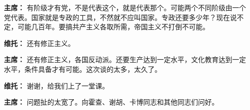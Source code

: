 \begin{duihua}
\item[\textbf{主席：}] 有阶级才有党，不是代表这个，就是代表那个。可能两个不同阶级由一个党代表。国家就是专政的工具，不然就不应叫国家。专政还要多少年？现在说不定，可能几百年。要搞共产主义各取所需，帝国主义不打倒不可能。
\item[\textbf{维托：}] 还有修正主义。
\item[\textbf{主席：}] 还有修正主义，各国反动派。还要生产达到一定水平，文化教育达到一定水平，条件具备才有可能。这次谈的太多，太久了。
\item[\textbf{维托：}] 谢谢，给我们上了一堂课。
\item[\textbf{主席：}] 问题扯的太宽了。向霍查、谢胡、卡博同志和其他同志们问好。
\end{duihua}

